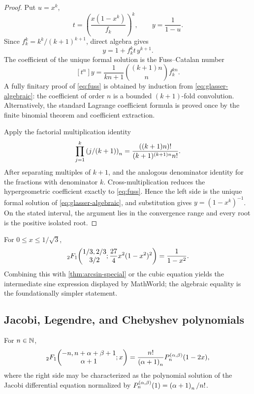 \begin{proof}
Put \(u=x^k\),
\[
 t=\left(\frac{x(1-x^k)}{f_k}\right)^k,
 \qquad y=\frac1{1-u}.
\]
Since \(f_k^k=k^k/(k+1)^{k+1}\), direct algebra gives
\begin{equation}\label{eq:glasser-algebraic}
 y=1+f_k^k t\,y^{k+1}.
\end{equation}
The coefficient of the unique formal solution is the Fuss--Catalan number
\begin{equation}\label{eq:fuss}
 [t^n]y=\frac1{kn+1}\binom{(k+1)n}{n}f_k^{kn}.
\end{equation}
A fully finitary proof of \eqref{eq:fuss} is obtained by induction from
\eqref{eq:glasser-algebraic}: the coefficient of order \(n\) is a bounded
\((k+1)\)-fold convolution.  Alternatively, the standard Lagrange coefficient
formula is proved once by the finite binomial theorem and coefficient
extraction.

Apply the factorial multiplication identity
\[
 \prod_{j=1}^{k}\left(j/(k+1)\right)_{n}
 =\frac{((k+1)n)!}{(k+1)^{(k+1)n}n!}.
\]
After separating multiples of \(k+1\), and the analogous denominator
identity for the fractions with denominator \(k\).  Cross-multiplication
reduces the hypergeometric coefficient exactly to \eqref{eq:fuss}.  Hence the
left side is the unique formal solution of \eqref{eq:glasser-algebraic}, and
substitution gives \(y=(1-x^k)^{-1}\).  On the stated interval, the argument
lies in the convergence range and every root is the positive isolated root.
\end{proof}

\begin{corollary}[The \(k=2\) trigonometric-looking case]
For \(0\le x\le1/\sqrt3\),
\[
 {}_2F_1\!\left(\begin{matrix}1/3,2/3\\3/2\end{matrix};\frac{27}{4}x^2(1-x^2)^2\right)
 =\frac1{1-x^2}.
\]
Combining this with \cref{thm:arcsin-special} or the cubic equation yields the
intermediate sine expression displayed by MathWorld; the algebraic equality
is the foundationally simpler statement.
\end{corollary}

\subsection{Jacobi, Legendre, and Chebyshev polynomials}

\begin{theorem}\label{thm:jacobi}
For \(n\in\mathbb N\),
\begin{equation}\label{eq:jacobi}
 {}_2F_1\!\left(\begin{matrix}-n,n+\alpha+\beta+1\\\alpha+1\end{matrix};x\right)
 =\frac{n!}{\left(\alpha+1\right)_{n}}P_n^{(\alpha,\beta)}(1-2x),
\end{equation}
where the right side may be characterized as the polynomial solution of the
Jacobi differential equation normalized by
\(P_n^{(\alpha,\beta)}(1)=\left(\alpha+1\right)_{n}/n!\).
\end{theorem}


